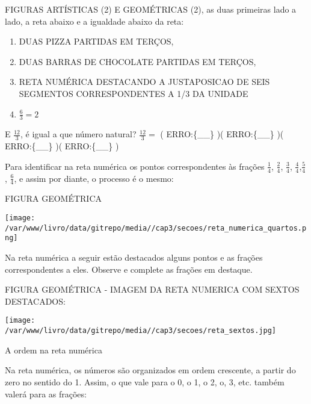 \documentclass[a4,12pt]{book}
\begin{document}
\begin{imagem*}[breakable]{}{}   FIGURAS ARTÍSTICAS (2) E GEOMÉTRICAS (2), as duas primeiras lado a lado, a reta abaixo e a igualdade abaixo da reta:  
\begin{enumerate} [\quad a)] %
    \item       DUAS PIZZA PARTIDAS EM TERÇOS,
    \item       DUAS BARRAS DE CHOCOLATE PARTIDAS EM TERÇOS,
    \item       RETA NUMÉRICA DESTACANDO A JUSTAPOSICAO DE SEIS SEGMENTOS CORRESPONDENTES A 1/3 DA UNIDADE
    \item             $\frac{6}{3}=2$        
\end{enumerate} %
  
\end{imagem*}

E $\frac{12}{3}$, é igual a que número natural? $\frac{12}{3}=$ ( ERRO:\{\_\_\} )( ERRO:\{\_\_\} )( ERRO:\{\_\_\} )( ERRO:\{\_\_\} ) \mbox{} \newline 

Para identificar na reta numérica os pontos correspondentes às frações $\frac{1}{4}$, $\frac{2}{4}$, $\frac{3}{4}$, $\frac{4}{4}$,$\frac{5}{4}$, $\frac{6}{4}$, e assim por diante, o processo é o mesmo:

\begin{imagem*}[breakable]{}{}   FIGURA GEOMÉTRICA  
  
    \texttt{[image: /var/www/livro/data/gitrepo/media//cap3/secoes/reta\_numerica\_quartos.png]}   \end{imagem*}

Na reta numérica a seguir estão destacados alguns pontos e as frações correspondentes a eles. Observe e complete as frações em destaque.

\begin{imagem*}[breakable]{}{}    FIGURA GEOMÉTRICA - IMAGEM DA RETA NUMERICA COM SEXTOS DESTACADOS:  
  
    \texttt{[image: /var/www/livro/data/gitrepo/media//cap3/secoes/reta\_sextos.jpg]}  
  
\end{imagem*}

A ordem na reta numérica\mbox{} \newline 

Na reta numérica, os números são organizados em ordem crescente, a partir do zero no sentido do 1. Assim, o que vale para o 0, o 1, o 2, o, 3, etc. também valerá para as frações: 
\end{document}
